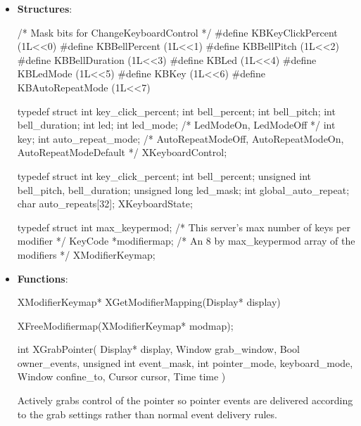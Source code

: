 \documentclass{report}
\begin{document}
    \pagebreak 
    \begin{itemize}
        \item \textbf{Structures}:
            \begin{cppcode}
            /* Mask bits for ChangeKeyboardControl */
            #define KBKeyClickPercent (1L<<0)
            #define KBBellPercent (1L<<1)
            #define KBBellPitch (1L<<2)
            #define KBBellDuration (1L<<3)
            #define KBLed (1L<<4)
            #define KBLedMode (1L<<5)
            #define KBKey (1L<<6)
            #define KBAutoRepeatMode (1L<<7)

            typedef struct {
                int key_click_percent;
                int bell_percent;
                int bell_pitch;
                int bell_duration;
                int led;
                int led_mode;           /* LedModeOn, LedModeOff */
                int key;
                int auto_repeat_mode;   /* AutoRepeatModeOff, AutoRepeatModeOn, AutoRepeatModeDefault */
            } XKeyboardControl;
            \end{cppcode}
            \begin{cppcode}
                typedef struct {
                    int key_click_percent;
                    int bell_percent;
                    unsigned int bell_pitch, bell_duration;
                    unsigned long led_mask;
                    int global_auto_repeat;
                    char auto_repeats[32];
                } XKeyboardState;  
            \end{cppcode}
            \bigbreak \noindent 
            \begin{cppcode}
                typedef struct {
                    int max_keypermod;	/* This server's max number of keys per modifier */
                    KeyCode *modifiermap;	/* An 8 by max_keypermod array of the modifiers */
                } XModifierKeymap;
            \end{cppcode}
    \item \textbf{Functions}:
        \begin{cppcode}
        XModifierKeymap* XGetModifierMapping(Display* display) 
        \end{cppcode}
        \bigbreak \noindent 
        \begin{cppcode}
        XFreeModifiermap(XModifierKeymap* modmap);
        \end{cppcode}
        \bigbreak \noindent 
        \begin{cppcode}
        int XGrabPointer(
            Display* display,
            Window grab_window,
            Bool owner_events,
            unsigned int event_mask,
            int pointer_mode, keyboard_mode,
            Window confine_to,
            Cursor cursor,
            Time time
        )
        \end{cppcode}
        \bigbreak \noindent
        Actively grabs control of the pointer so pointer events are delivered according to the grab settings rather than normal event delivery rules.


\end{itemize}
\end{document}
